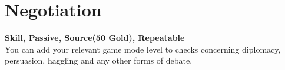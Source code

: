 \section{Negotiation}\label{sec:negotiation}
\textbf{Skill, Passive, Source(50 Gold), Repeatable}\\
You can add your relevant game mode level to checks concerning diplomacy, persuasion, haggling and any other forms of debate.